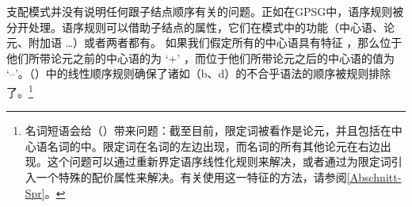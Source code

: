 支配模式并没有说明任何跟子结点顺序有关的问题\indexgpsgc。正如在GPSG中，语序规则被分开处理。语序规则可以借助子结点的属性，它们在模式中的功能（中心语、论元、附加语 \ldots）或者两者都有。
如果我们假定所有的中心语具有特征\initial{} ，那么位于他们所带论元之前的中心语的\initialvc 为 `$+$' ，而位于他们所带论元之后的中心语的值为 `--'。（）中的线性顺序规则确保了诸如（b、d）的不合乎语法的顺序被规则排除了。\footnote{%
  名词短语会给（）带来问题：截至目前，限定词被看作是论元，并且包括在中心语名词的\subcatlc 中。限定词在名词的左边出现，而名词的所有其他论元在右边出现。这个问题可以通过重新界定语序线性化规则\citep[--165]{Mueller99a}来解决，或者通过为限定词引入一个特殊的配价属性来解决\citep[\S~9.4]{ps2}。有关使用这一特征的方法，请参阅\ref{Abschnitt-Spr}。
}

